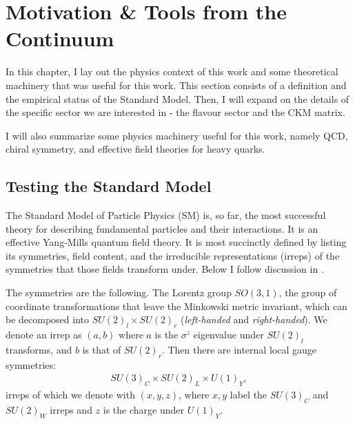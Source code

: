 ﻿\chapter{Motivation \& Tools from the Continuum}
\label{chap:background}

In this chapter, I lay out the physics context of this work and some theoretical machinery that was useful for this work. This section consists of a definition and the empirical status of the Standard Model. Then, I will expand on the details of the specific sector we are interested in - the flavour sector and the CKM matrix.

I will also summarize some physics machinery useful for this work, namely QCD, chiral symmetry, and effective field theories for heavy quarks.

\section{Testing the Standard Model}

The Standard Model of Particle Physics (SM) \cite{GLASHOW1961579,PhysRevLett.19.1264,Salam:1968rm} is, so far, the most successful theory for describing fundamental particles and their interactions. It is an effective Yang-Mills quantum field theory. It is most succinctly defined by listing its symmetries, field content, and the irreducible representations (irreps) of the symmetries that those fields transform under. Below I follow discussion in \cite{Schwartz:2013pla}.

The symmetries are the following. The Lorentz group $SO(3,1)$, the group of coordinate transformations that leave the Minkowski metric invariant, which can be decomposed into $SU(2)_l\times SU(2)_r$ ({\it{left-handed}} and {\it{right-handed}}). We denote an irrep as $(a,b)$ where $a$ is the $\sigma^z$ eigenvalue under $SU(2)_l$ transforms, and $b$ is that of $SU(2)_r$. Then there are internal local gauge symmetries:
\begin{align}
  SU(3)_C\times SU(2)_L \times U(1)_Y,
\end{align}
irreps of which we denote with $(x,y,z)$, where $x,y$ label the $SU(3)_C$ and $SU(2)_W$ irreps and $z$ is the charge under $U(1)_Y$.

